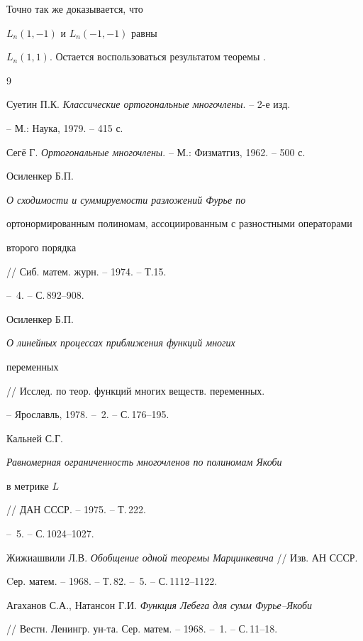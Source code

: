 Точно так же доказывается, что


$ L_n(1,-1)$ и $ L_n(-1,-1)$ равны


$ L_n(1,1)$. Остается воспользоваться результатом теоремы .





\begin{thebibliography}{9}







Суетин П.К. {\em Классические ортогональные многочлены}. -- 2-е изд.


-- М.: Наука, 1979. -- 415 с.




Сег\"е Г. {\em Ортогональные многочлены}. -- М.: Физматгиз, 1962. -- 500 с.




Осиленкер Б.П. {\em О сходимости и суммируемости разложений Фурье по


ортонормированным полиномам, ассоциированным с разностными операторами


второго порядка} // Сиб. матем. журн. -- 1974. -- Т.15.


-- \No\,4. -- С.\,892--908.




Осиленкер Б.П. {\em О линейных процессах приближения функций многих


переменных} // Исслед. по теор. функций многих веществ. переменных.


-- Ярославль, 1978. -- \No\,2. -- С.\,176--195.




Кальней С.Г. {\em Равномерная ограниченность многочленов по полиномам Якоби


в метрике $L$} // ДАН СССР. -- 1975. -- Т.\,222.


-- \No\,5. -- С.\,1024--1027.




Жижиашвили Л.В. {\em Обобщение одной теоремы Марцинкевича} // Изв. АН СССР.


Cер. матем. -- 1968. -- Т.\,82. -- \No\,5. -- С.\,1112--1122.




Агаханов С.А., Натансон Г.И. {\em Функция Лебега для сумм Фурье--Якоби}


// Вестн. Ленингр. ун-та. Сер. матем. -- 1968. -- \No\,1. -- С.\,11--18.





\end{thebibliography}





\vskip 2cm












\label{end}





